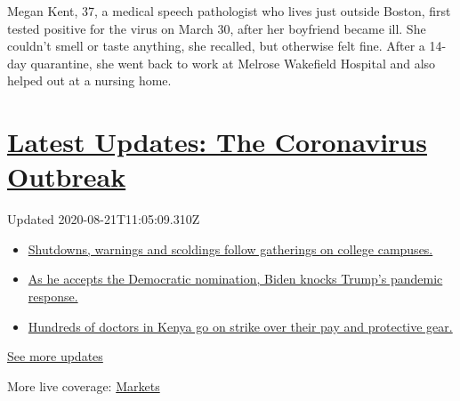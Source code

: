 Megan Kent, 37, a medical speech pathologist who lives just outside
Boston, first tested positive for the virus on March 30, after her
boyfriend became ill. She couldn't smell or taste anything, she
recalled, but otherwise felt fine. After a 14-day quarantine, she went
back to work at Melrose Wakefield Hospital and also helped out at a
nursing home.

\hypertarget{latest-updates-the-coronavirus-outbreak}{%
\section{\texorpdfstring{\href{https://www.nytimes3xbfgragh.onion/2020/08/21/world/covid-19-coronavirus.html?action=click\&pgtype=Article\&state=default\&region=MAIN_CONTENT_1\&context=storylines_live_updates}{Latest
Updates: The Coronavirus
Outbreak}}{Latest Updates: The Coronavirus Outbreak}}\label{latest-updates-the-coronavirus-outbreak}}

Updated 2020-08-21T11:05:09.310Z

\begin{itemize}
\tightlist
\item
  \href{https://www.nytimes3xbfgragh.onion/2020/08/21/world/covid-19-coronavirus.html?action=click\&pgtype=Article\&state=default\&region=MAIN_CONTENT_1\&context=storylines_live_updates\#link-4690b6aa}{Shutdowns,
  warnings and scoldings follow gatherings on college campuses.}
\item
  \href{https://www.nytimes3xbfgragh.onion/2020/08/21/world/covid-19-coronavirus.html?action=click\&pgtype=Article\&state=default\&region=MAIN_CONTENT_1\&context=storylines_live_updates\#link-324af071}{As
  he accepts the Democratic nomination, Biden knocks Trump's pandemic
  response.}
\item
  \href{https://www.nytimes3xbfgragh.onion/2020/08/21/world/covid-19-coronavirus.html?action=click\&pgtype=Article\&state=default\&region=MAIN_CONTENT_1\&context=storylines_live_updates\#link-35890b73}{Hundreds
  of doctors in Kenya go on strike over their pay and protective gear.}
\end{itemize}

\href{https://www.nytimes3xbfgragh.onion/2020/08/21/world/covid-19-coronavirus.html?action=click\&pgtype=Article\&state=default\&region=MAIN_CONTENT_1\&context=storylines_live_updates}{See
more updates}

More live coverage:
\href{https://www.nytimes3xbfgragh.onion/live/2020/08/20/business/stock-market-today-coronavirus?action=click\&pgtype=Article\&state=default\&region=MAIN_CONTENT_1\&context=storylines_live_updates}{Markets}

